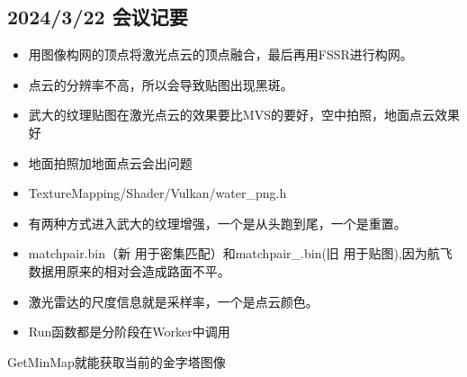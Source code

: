 \subsection{2024/3/22 会议记要}

\begin{itemize}
    \item 用图像构网的顶点将激光点云的顶点融合，最后再用FSSR进行构网。
    \item 点云的分辨率不高，所以会导致贴图出现黑斑。
    \item 武大的纹理贴图在激光点云的效果要比MVS的要好，空中拍照，地面点云效果好
    \item 地面拍照加地面点云会出问题
    \item TextureMapping/Shader/Vulkan/water_png.h
    \item 有两种方式进入武大的纹理增强，一个是从头跑到尾，一个是重置。
    \item matchpair.bin（新 用于密集匹配）和matchpair_.bin(旧 用于贴图),因为航飞数据用原来的相对会造成路面不平。
    \item 激光雷达的尺度信息就是采样率，一个是点云颜色。
    \item Run函数都是分阶段在Worker中调用
\end{itemize}

GetMinMap就能获取当前的金字塔图像